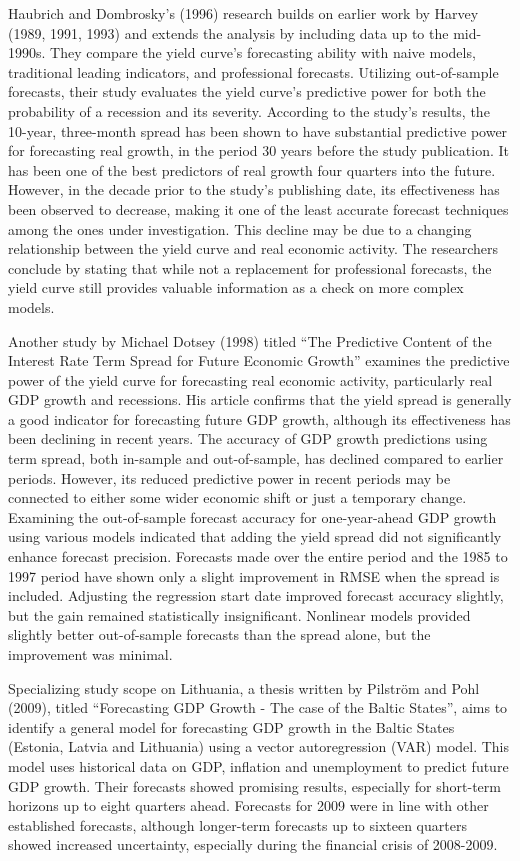 \documentclass[12pt]{article}
\begin{document}
Haubrich and Dombrosky's (1996) research builds on earlier work by Harvey (1989, 1991, 1993) and extends the analysis by including data up to the mid-1990s. They compare the yield curve's forecasting ability with naive models, traditional leading indicators, and professional forecasts. Utilizing out-of-sample forecasts, their study evaluates the yield curve's predictive power for both the probability of a recession and its severity. According to the study's results, the 10-year, three-month spread has been shown to have substantial predictive power for forecasting real growth, in the period 30 years before the study publication. It has been one of the best predictors of real growth four quarters into the future. However, in the decade prior to the study's publishing date, its effectiveness has been observed to decrease, making it one of the least accurate forecast techniques among the ones under investigation. This decline may be due to a changing relationship between the yield curve and real economic activity. The researchers conclude by stating that while not a replacement for professional forecasts, the yield curve still provides valuable information as a check on more complex models.


Another study by Michael Dotsey (1998) titled ``The Predictive Content of the Interest Rate Term Spread for Future Economic Growth'' examines the predictive power of the yield curve for forecasting real economic activity, particularly real GDP growth and recessions. His article confirms that the yield spread is generally a good indicator for forecasting future GDP growth, although its effectiveness has been declining in recent years. The accuracy of GDP growth predictions using term spread, both in-sample and out-of-sample, has declined compared to earlier periods. However, its reduced predictive power in recent periods may be connected to either some wider economic shift or just a temporary change. Examining the out-of-sample forecast accuracy for one-year-ahead GDP growth using various models indicated that adding the yield spread did not significantly enhance forecast precision. Forecasts made over the entire period and the 1985 to 1997 period have shown only a slight improvement in RMSE when the spread is included. Adjusting the regression start date improved forecast accuracy slightly, but the gain remained statistically insignificant. Nonlinear models provided slightly better out-of-sample forecasts than the spread alone, but the improvement was minimal. 

Specializing study scope on Lithuania, a thesis written by Pilström and  Pohl (2009), titled ``Forecasting GDP Growth - The case of the Baltic States'', aims to identify a general model for forecasting GDP growth in the Baltic States (Estonia, Latvia and Lithuania) using a vector autoregression (VAR) model. This model uses historical data on GDP, inflation and unemployment to predict future GDP growth. Their forecasts showed promising results, especially for short-term horizons up to eight quarters ahead. Forecasts for 2009 were in line with other established forecasts, although longer-term forecasts up to sixteen quarters showed increased uncertainty, especially during the financial crisis of 2008-2009.
\end{document}
